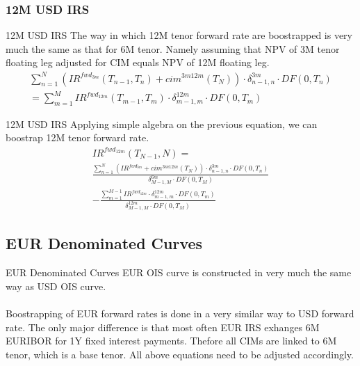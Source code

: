 \documentclass{beamer}
\begin{document}
\subsubsection{12M USD IRS}

\begin{frame}{12M USD IRS}
The way in which 12M tenor forward rate are boostrapped is very much the same as that for 6M tenor. Namely assuming that NPV of 3M tenor floating leg adjusted for CIM equals NPV of 12M floating leg.
\begin{multline*}
\sum_{n = 1}^N \left(IR^{fwd_{3m}}(T_{n - 1}, T_n) + cim^{3m12m}(T_N) \right) \cdot \delta_{n - 1, n}^{3m} \cdot DF(0, T_n)\\
= \sum_{m = 1}^M IR^{fwd_{12m}}(T_{m - 1}, T_m) \cdot \delta_{m - 1, m}^{12m} \cdot DF(0, T_m)
\end{multline*}
\end{frame}

\begin{frame}{12M USD IRS}
Applying simple algebra on the previous equation, we can boostrap 12M tenor forward rate.
\begin{multline*}
IR^{fwd_{12m}}(T_{N-1}, N) =\\
\frac{\sum_{n = 1}^N \left(IR^{fwd_{3m}} + cim^{3m12m}(T_N) \right) \cdot \delta_{n - 1, n}^{3m} \cdot DF(0, T_n)}{\delta_{M - 1, M}^{6m} \cdot DF(0, T_M)}\\
- \frac{\sum_{m = 1}^{M -1} IR^{fwd_{12m}} \cdot \delta_{m - 1, m}^{12m} \cdot DF(0, T_m)}{\delta_{M - 1, M}^{12m} \cdot DF(0, T_M)}
\end{multline*}
\end{frame}

\subsection{EUR Denominated Curves}

\begin{frame}{EUR Denominated Curves}
EUR OIS curve is constructed in very much the same way as USD OIS curve.
\\~\\
Boostrapping of EUR forward rates is done in a very similar way to USD forward rate. The only major difference is that most often EUR IRS exhanges 6M EURIBOR for 1Y fixed interest payments. Thefore all CIMs are linked to 6M tenor, which is a base tenor. All above equations need to be adjusted accordingly.
\end{frame}
\end{document}
